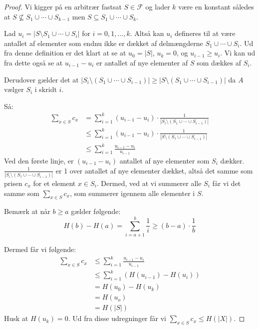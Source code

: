 \begin{proof}
	Vi kigger på en arbitrær fastsat $S \in \mathcal{F}$ og lader $k$ være en konstant således at $S \not \subseteq S_{1} \cup \cdots \cup S_{k-1}$ men $S \subseteq S_{1} \cup \cdots \cup S_{k}$.

	Lad $u_{i} = |S \setminus S_{1} \cup \cdots \cup S_{i}|$ for $i = 0,1, \ldots, k$. Altså kan $u_{i}$ defineres til at være antallet af elementer som endnu ikke er dækket af delmængderne $S_{1} \cup \cdots \cup S_{i}$. Ud fra denne definition er det klart at se at $u_{0} = |S|$, $u_{k} = 0$, og $u_{i-1} \ge u_{i}$. Vi kan ud fra dette også se at $u_{i-1} - u_{i}$ er antallet af nye elementer af $S$ som dækkes af $S_{i}$.

	Derudover gælder det at $|S_{i} \setminus (S_1 \cup \cdots \cup S_{i-1})| \ge |S \setminus (S_{1} \cup \cdots \cup S_{i-1})|$ da $A$ vælger $S_{i}$ i skridt $i$.

	Så:
	\begin{align*}
		\sum_{x \in S} c_{x} & = \sum_{i=1}^k (u_{i-1}-u_{i}) \cdot \frac{1}{|S_{i} \setminus (S_{1} \cup \cdots \cup S_{i-1})|} \\
		                     & \le \sum_{i=1}^k  (u_{i-1}-u_{i}) \cdot \frac{1}{|S \setminus (S_{1} \cup \cdots \cup S_{i-1})|}  \\
		                     & \le \sum_{i=1}^k \frac{u_{i-1}-u_{i}}{u_{i-1}}
	\end{align*}
	Ved den første linje, er $(u_{i-1}-u_{i})$ antallet af nye elementer som $S_{i}$ dækker. $\frac{1}{|S_{i} \setminus (S_{1} \cup \cdots \cup S_{i-1})|}$ er 1 over antallet af nye elementer dækket, altså det samme som prisen $c_{x}$ for et element $x \in S_{i}$. Dermed, ved at vi summerer alle $S_{i}$ får vi det samme som $\sum_{x \in S} c_{x}$, som summerer igennem alle elementer i $S$.


	Bemærk at når $b \ge a$ gælder følgende:
	\begin{equation*}
		H(b)-H(a) = \sum_{i=a+1}^b \frac{1}{i} \ge (b-a) \cdot \frac{1}{b}
	\end{equation*}

	Dermed får vi følgende:
	\begin{align*}
		\sum_{x \in S} c_{x} & \le \sum_{i=1}^k \frac{u_{i-1}-u_{i}}{u_{i-1}} \\
		                     & \le \sum_{i=1}^k (H(u_{i-1})-H(u_i))           \\
		                     & = H(u_{0}) - H(u_{k})                          \\
		                     & = H(u_{o})                                     \\
		                     & = H(|S|)
	\end{align*}
	Husk at $H(u_{k}) = 0$.
	Ud fra disse udregninger får vi $\sum_{x \in S} c_{x} \le H(|X|)$.
\end{proof}


